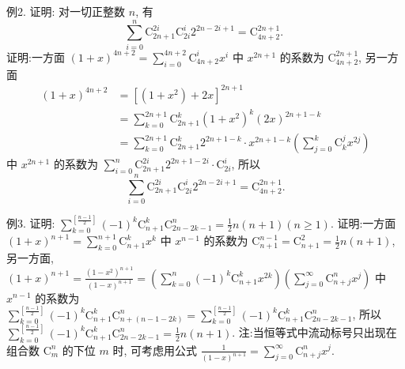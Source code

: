 例2. 证明: 对一切正整数 $n$, 有
$$
\sum_{i=0}^n \mathrm{C}_{2 n+1}^{2 i} \mathrm{C}_{2 i}^i 2^{2 n-2 i+1}=\mathrm{C}_{4 n+2}^{2 n+1} \text {. }
$$
证明:一方面 $(1+x)^{4 n+2}=\sum_{i=0}^{4 n+2} \mathrm{C}_{4 n+2}^i x^i$ 中 $x^{2 n+1}$ 的系数为 $\mathrm{C}_{4 n+2}^{2 n+1}$, 另一方面
$$
\begin{aligned}
(1+x)^{4 n+2} & =\left[\left(1+x^2\right)+2 x\right]^{2 n+1} \\
& =\sum_{k=0}^{2 n+1} \mathrm{C}_{2 n+1}^k\left(1+x^2\right)^k(2 x)^{2 n+1-k} \\
& =\sum_{k=0}^{2 n+1} \mathrm{C}_{2 n+1}^k 2^{2 n+1-k} \cdot x^{2 n+1-k}\left(\sum_{j=0}^k \mathrm{C}_k^j x^{2 j}\right)
\end{aligned}
$$
中 $x^{2 n+1}$ 的系数为 $\sum_{i=0}^n \mathrm{C}_{2 n+1}^{2 i} 2^{2 n+1-2 i} \cdot \mathrm{C}_{2 i}^i$, 所以
$$
\sum_{i=0}^n \mathrm{C}_{2 n+1}^{2 i} \mathrm{C}_{2 i}^i 2^{2 n-2 i+1}=\mathrm{C}_{4 n+2}^{2 n+1} .
$$



例3. 证明: $\sum_{k=0}^{\left[\frac{n-1}{2}\right]}(-1)^k \mathrm{C}_{n+1}^k \mathrm{C}_{2 n-2 k-1}^n=\frac{1}{2} n(n+1)(n \geqslant 1)$.
证明:一方面 $(1+x)^{n+1}=\sum_{k=0}^{n+1} \mathrm{C}_{n+1}^k x^k$ 中 $x^{n-1}$ 的系数为 $\mathrm{C}_{n+1}^{n-1}=\mathrm{C}_{n+1}^2= \frac{1}{2} n(n+1)$, 另一方面, $(1+x)^{n+1}=\frac{\left(1-x^2\right)^{n+1}}{(1-x)^{n+1}}=\left(\sum_{k=0}^n(-1)^k \mathrm{C}_{n+1}^k x^{2 k}\right)\left(\sum_{j=0}^{\infty} \mathrm{C}_{n+j}^n x^j\right)$ 中 $x^{n-1}$ 的系数为 $\sum_{k=0}^{\left[\frac{n-1}{2}\right]}(-1)^k \mathrm{C}_{n+1}^k \mathrm{C}_{n+(n-1-2 k)}^n=\sum_{k=0}^{\left[\frac{n-1}{2}\right]}(-1)^k \mathrm{C}_{n+1}^k \mathrm{C}_{2 n-2 k-1}^n$, 所以 $\sum_{k=0}^{\left[\frac{n-1}{2}\right]}(-1)^k \mathrm{C}_{n+1}^k \mathrm{C}_{2 n-2 k-1}^n=\frac{1}{2} n(n+1)$.
注:当恒等式中流动标号只出现在组合数 $\mathrm{C}_m^n$ 的下位 $m$ 时, 可考虑用公式 $\frac{1}{(1-x)^{n+1}}=\sum_{j=0}^{\infty} \mathrm{C}_{n+j}^n x^j$.



